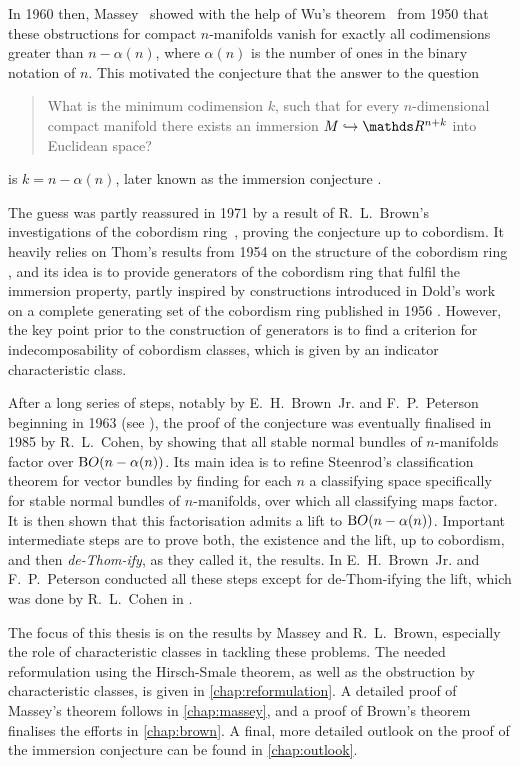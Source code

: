 In 1960 then, Massey~\cite{massey} showed with the help of Wu's
theorem~\cite{wu} from 1950 that these obstructions for compact
$n$-manifolds vanish for exactly all codimensions greater than
$n-\alpha(n)$, where $\alpha(n)$ is the number of ones in the binary
notation of $n$.
This motivated the conjecture that the answer to the question
\begin{quote}
    What is the minimum codimension $k$, such that for every
    $n$-dimensional compact manifold there exists an
    immersion $M\immto\R^{n+k}$ into Euclidean space?
\end{quote}
is $k=n-\alpha(n)$, later known as the immersion conjecture
\cite{cohen}.

The guess was partly reassured in 1971 by a result of R.~L.~Brown's
investigations of the cobordism ring~\cite{brown}, proving the
conjecture up to cobordism. It heavily relies on Thom's results from
1954 on the structure of the cobordism ring \cite{thomfrench},
and its idea is to provide generators of the
cobordism ring that fulfil the immersion property, partly inspired by
constructions introduced in Dold's work on a complete generating set
of the cobordism ring published in 1956 \cite{dold}.
However, the key point prior to the construction of generators is to
find a criterion for indecomposability of cobordism classes, which is
given by an indicator characteristic class.

After a long series of steps, notably by E.~H.~Brown~Jr. and
F.~P.~Peterson beginning in 1963 (see \cite{cohen}), the proof of the
conjecture was eventually finalised in 1985 by R.~L.~Cohen, by showing
that all stable normal bundles of $n$-manifolds factor over
$\mathrm{B}O(n-\alpha(n))$.
Its main idea is to refine Steenrod's classification theorem for
vector bundles by finding for each $n$ a classifying space specifically
for stable normal bundles of $n$-manifolds, over which all classifying
maps factor. It is then shown that this factorisation admits a lift to
$\mathrm{B}O(n-\alpha(n))$.
Important intermediate steps are to prove both, the existence and the
lift, up to cobordism, and then \emph{de-Thom-ify}, as they called it,
the results.
In \cite{brownpeterson} E.~H.~Brown~Jr. and F.~P.~Peterson conducted
all these steps except for de-Thom-ifying the lift,
which was done by R.~L.~Cohen in \cite{cohen}.

The focus of this thesis is on the results by Massey and
R.~L.~Brown, especially the role of characteristic classes in tackling
these problems.
The needed reformulation using the Hirsch-Smale theorem, as well as
the obstruction by characteristic classes, is given in
\autoref{chap:reformulation}.
A detailed proof of Massey's theorem follows in \autoref{chap:massey},
and a proof of Brown's theorem finalises the efforts in
\autoref{chap:brown}.
A final, more detailed outlook on the proof of the immersion
conjecture can be found in \autoref{chap:outlook}.

